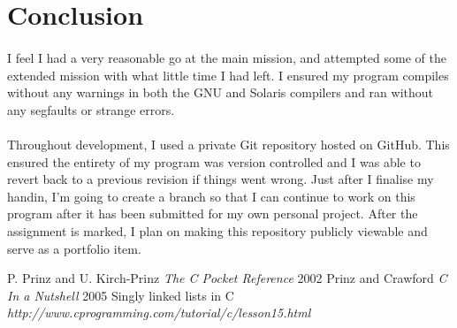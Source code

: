 \documentclass[pdftex,12pt,a4paper]{article}
\begin{document}
\section{Conclusion}
\paragraph{}I feel I had a very reasonable go at the main mission, and attempted some of the extended mission with what little time I had left. I ensured my program compiles without any warnings in both the GNU and Solaris compilers and ran without any segfaults or strange errors.
\paragraph{}Throughout development, I used a private Git repository hosted on GitHub. This ensured the entirety of my program was version controlled and I was able to revert back to a previous revision if things went wrong. Just after I finalise my handin, I'm going to create a branch so that I can continue to work on this program after it has been submitted for my own personal project. After the assignment is marked, I plan on making this repository publicly viewable and serve as a portfolio item.

\begin{thebibliography}{1}
\bibitem{} P. Prinz and U. Kirch-Prinz {\em The C Pocket Reference} 2002
\bibitem{} Prinz and Crawford {\em C In a Nutshell} 2005
\bibitem{} Singly linked lists in C {\em http://www.cprogramming.com/tutorial/c/lesson15.html}
\end{thebibliography}
\end{document}

